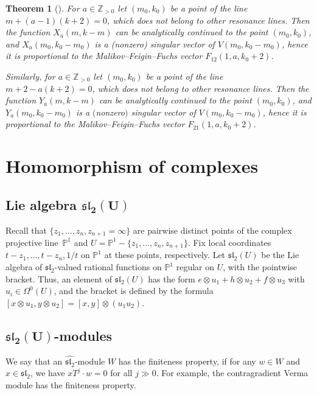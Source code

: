 \documentclass[pdftex]{sigma}
\numberwithin{equation}{section}
\newtheorem{thm}{Theorem}[section]
\begin{document}
\begin{thm}[{\cite[Theorem 6.2]{SV2}}]\label{limit}For $a\in{\mathbb Z}_{>0}$ let $(m_0, k_0)$ be a point of the line $ m+(a-1)(k+2)=0$, which does not belong to other resonance lines. Then the function $X_a(m,k-m)$ can be analytically continued to the point $(m_0,k_0)$, and $X_a(m_0,k_0-m_0)$ is a (nonzero) singular vector of $V(m_0,k_0-m_0)$, hence it is proportional to the Malikov--Feigin--Fuchs vector $F_{12}(1,a, k_0+2)$.

Similarly, for $a\in{\mathbb Z}_{>0}$ let $(m_0, k_0)$ be a point of the line $m+2-a(k+2)=0$, which does not belong to other resonance lines. Then the function $Y_a(m,k-m)$ can be analytically continued to the point $(m_0,k_0)$, and $Y_a(m_0,k_0-m_0)$ is a $($nonzero$)$ singular vector of $V(m_0,k_0-m_0)$, hence it is proportional to the Malikov--Feigin--Fuchs vector $F_{21}(1,a, k_0+2)$.
\end{thm}

\section{Homomorphism of complexes}\label{sec homs}

\subsection[Lie algebra $\mathfrak{sl}_2(U)$]{Lie algebra $\boldsymbol{\mathfrak{sl}_2(U)}$}\label{conf block}
Recall that $\{z_1,\dots,z_n,z_{n+1}=\infty\}$ are pairwise distinct points of the complex projective line~${\mathbb P}^1$ and $U={\mathbb P}^1 -\{z_1,\dots,z_n,z_{n+1}\}$. Fix local coordinates $t-z_1,\dots, t-z_n,1/t$ on ${\mathbb P}^1$ at these points, respectively.
Let $\mathfrak{sl}_2(U)$ be the Lie algebra of $\mathfrak{sl}_2$-valued rational functions on ${\mathbb P}^1$ regular on $U$, with the pointwise bracket. Thus, an element of $\mathfrak{sl}_2(U)$ has the form $e\otimes u_1 + h\otimes u_2+ f\otimes u_3$ with $u_i\in\Omega^0(U)$, and the bracket is defined by the formula $[x\otimes u_1, y\otimes u_2] = [x,y]\otimes (u_1u_2)$.

\subsection[$\mathfrak{sl}_2(U)$-modules]{$\boldsymbol{\mathfrak{sl}_2(U)}$-modules}
We say that an $\widehat{{\mathfrak{sl}_2}}$-module $W$ has the finiteness property, if for any $w\in W$ and $ x\in\mathfrak{sl}_2$, we have $xT^j \cdot w=0$ for all $j \gg 0$. For example, the contragradient Verma module has the finiteness property.
\end{document}

